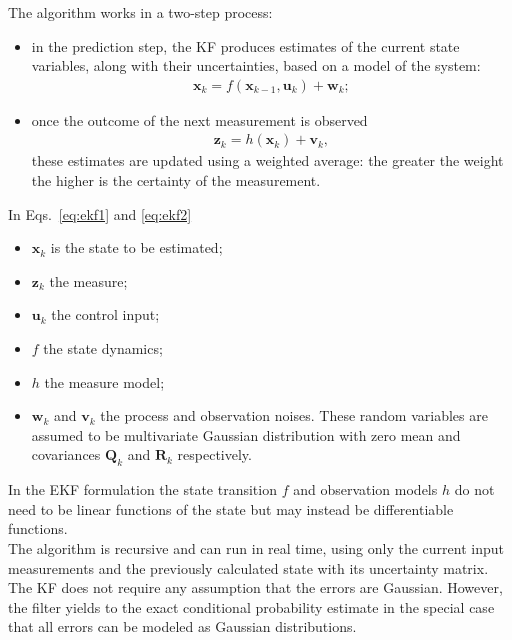 The algorithm works in a two-step process:
\begin{itemize}
\item in the prediction step, the KF produces estimates of the current state variables, along with their uncertainties, based on a model of the system:
\begin{align}
\boldsymbol{x}_k = f(\boldsymbol{x}_{k-1},\boldsymbol{u}_k) + \boldsymbol{w}_k
 \label{eq:ekf1} ;
\end{align} 
\item once the outcome of the next measurement is observed
\begin{align}
\boldsymbol{z}_k = h(\boldsymbol{x}_{k}) + \boldsymbol{v}_k
 \label{eq:ekf2} ,
\end{align}
these estimates are updated using a weighted average: the greater the weight the higher is the certainty of the measurement.
\end{itemize}
\newpage
In Eqs.~\eqref{eq:ekf1} and \eqref{eq:ekf2}
\begin{itemize}
\item $\boldsymbol{x}_k$ is the state to be estimated;
\item $\boldsymbol{z}_k$ the measure;
\item $\boldsymbol{u}_k$ the control input;
\item $f$ the state dynamics;
\item $h$ the measure model;
\item $\boldsymbol{w}_k$ and $\boldsymbol{v}_k$ the process and observation noises. These random variables are assumed to be multivariate Gaussian distribution with zero mean and covariances $\boldsymbol{Q}_k$ and $\boldsymbol{R}_k$ respectively.
\end{itemize}
In the EKF formulation the state transition $f$ and observation models $h$ do not need to be linear functions of the state but may instead be differentiable functions.\\

The algorithm is recursive and can run in real time, using only the current input measurements and the previously calculated state with its uncertainty matrix.
The KF does not require any assumption that the errors are Gaussian. However, the filter yields to the exact conditional probability estimate in the special case that all errors can be modeled as Gaussian distributions.\\

